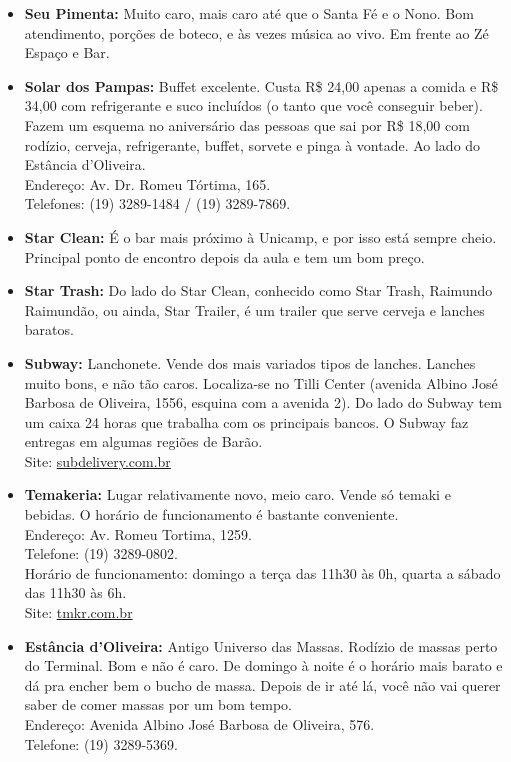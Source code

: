 \begin{itemize}
\item   \textbf{Seu Pimenta:} Muito caro, mais caro até que o Santa Fé e o Nono.
        Bom atendimento, porções de boteco, e às vezes música ao vivo. Em frente
        ao Zé Espaço e Bar.

\item   \textbf{Solar dos Pampas:} Buffet excelente. Custa R\$ 24,00 apenas a
        comida e R\$ 34,00 com refrigerante e suco incluídos (o tanto que você
        conseguir beber). Fazem um esquema no aniversário das pessoas que sai
        por R\$ 18,00 com rodízio, cerveja, refrigerante, buffet, sorvete e
        pinga à vontade. Ao lado do Estância d'Oliveira.
        \\Endereço: Av. Dr. Romeu Tórtima, 165.
        \\Telefones: (19) 3289-1484 / (19) 3289-7869.

\item   \textbf{Star Clean:} É o bar mais próximo à Unicamp, e por isso está
        sempre cheio. Principal ponto de encontro depois da aula e tem um bom
        preço.

\item   \textbf{Star Trash:} Do lado do Star Clean, conhecido como Star Trash,
        Raimundo Raimundão, ou ainda, Star Trailer, é um trailer que serve
        cerveja e lanches baratos.

\item   \textbf{Subway:} Lanchonete. Vende dos mais variados tipos de lanches.
        Lanches muito bons, e não tão caros. Localiza-se no Tilli Center
        (avenida Albino José Barbosa de Oliveira, 1556, esquina com a avenida
        2). Do lado do Subway tem um caixa 24 horas que trabalha com os
        principais bancos. O Subway faz entregas em algumas regiões de Barão.
        \\Site: \url{subdelivery.com.br}

\item   \textbf{Temakeria:} Lugar relativamente novo, meio caro. Vende só temaki
        e bebidas. O horário de funcionamento é bastante conveniente.
        \\Endereço: Av. Romeu Tortima, 1259.
        \\Telefone: (19) 3289-0802.
        \\Horário de funcionamento: domingo a terça das 11h30 às 0h, quarta a
        sábado das 11h30 às 6h.
        \\Site: \url{tmkr.com.br}

\item   \textbf{Estância d'Oliveira:} Antigo Universo das Massas. Rodízio de
        massas perto do Terminal. Bom e não é caro. De domingo à noite é o
        horário mais barato e dá pra encher bem o bucho de massa. Depois de ir
        até lá, você não vai querer saber de comer massas por um bom tempo.
        \\Endereço: Avenida Albino José Barbosa de Oliveira, 576.
        \\Telefone: (19) 3289-5369.


\end{itemize}
